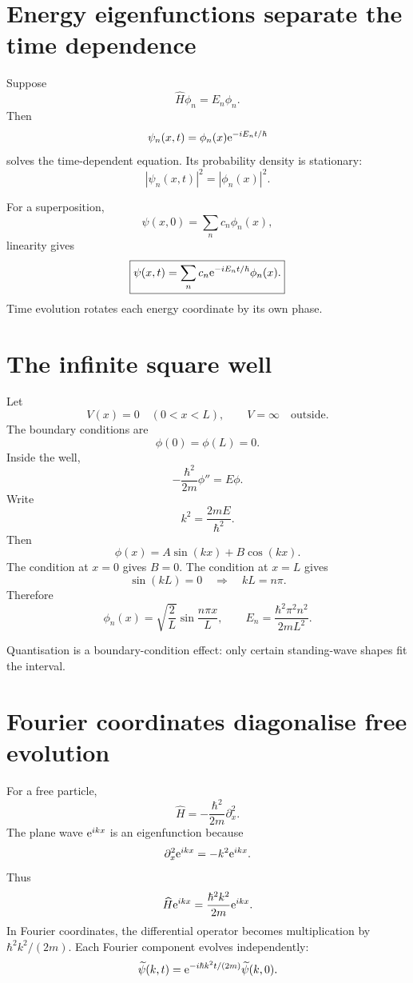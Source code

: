 \documentclass[11pt,a4paper]{article}
\begin{document}
\section{Energy eigenfunctions separate the time dependence}

Suppose
\[
\widehat H\phi_n=E_n\phi_n.
\]
Then
\[
\psi_n(x,t)=\phi_n(x)\mathrm e^{-iE_nt/\hbar}
\]
solves the time-dependent equation. Its probability density is stationary:
\[
|\psi_n(x,t)|^2=|\phi_n(x)|^2.
\]

For a superposition,
\[
\psi(x,0)=\sum_n c_n\phi_n(x),
\]
linearity gives
\[
\boxed{
\psi(x,t)=\sum_n c_n\mathrm e^{-iE_nt/\hbar}\phi_n(x).}
\]
Time evolution rotates each energy coordinate by its own phase.

\section{The infinite square well}

Let
\[
V(x)=0\quad(0<x<L),
\qquad
V=\infty\quad\text{outside}.
\]
The boundary conditions are
\[
\phi(0)=\phi(L)=0.
\]
Inside the well,
\[
-\frac{\hbar^2}{2m}\phi''=E\phi.
\]
Write
\[
k^2=\frac{2mE}{\hbar^2}.
\]
Then
\[
\phi(x)=A\sin(kx)+B\cos(kx).
\]
The condition at $x=0$ gives $B=0$. The condition at $x=L$ gives
\[
\sin(kL)=0
\quad\Longrightarrow\quad
kL=n\pi.
\]
Therefore
\[
\boxed{
\phi_n(x)=\sqrt{\frac2L}\sin\frac{n\pi x}{L},
\qquad
E_n=\frac{\hbar^2\pi^2n^2}{2mL^2}.}
\]

\begin{center}
\end{center}

Quantisation is a boundary-condition effect: only certain standing-wave shapes fit the interval.

\section{Fourier coordinates diagonalise free evolution}

For a free particle,
\[
\widehat H=-\frac{\hbar^2}{2m}\partial_x^2.
\]
The plane wave $\mathrm e^{ikx}$ is an eigenfunction because
\[
\partial_x^2\mathrm e^{ikx}=-k^2\mathrm e^{ikx}.
\]
Thus
\[
\widehat H\mathrm e^{ikx}=\frac{\hbar^2k^2}{2m}\mathrm e^{ikx}.
\]
In Fourier coordinates, the differential operator becomes multiplication by $\hbar^2k^2/(2m)$. Each Fourier component evolves independently:
\[
\widetilde\psi(k,t)
=\mathrm e^{-i\hbar k^2t/(2m)}\widetilde\psi(k,0).
\]
\end{document}
